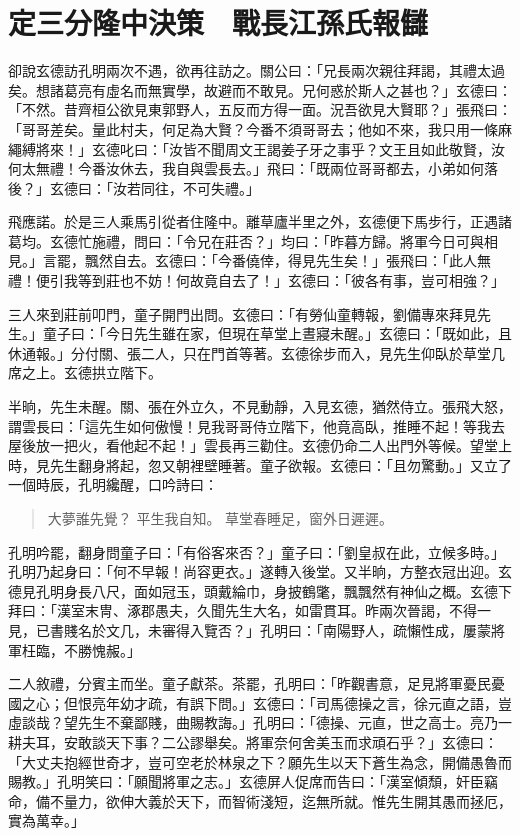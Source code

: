 
\chapter{定三分隆中決策　戰長江孫氏報讎}

卻說玄德訪孔明兩次不遇，欲再往訪之。關公曰：「兄長兩次親往拜謁，其禮太過矣。想諸葛亮有虛名而無實學，故避而不敢見。兄何惑於斯人之甚也？」玄德曰：「不然。昔齊桓公欲見東郭野人，五反而方得一面。況吾欲見大賢耶？」張飛曰：「哥哥差矣。量此村夫，何足為大賢？今番不須哥哥去；他如不來，我只用一條麻繩縛將來！」玄德叱曰：「汝皆不聞周文王謁姜子牙之事乎？文王且如此敬賢，汝何太無禮！今番汝休去，我自與雲長去。」飛曰：「既兩位哥哥都去，小弟如何落後？」玄德曰：「汝若同往，不可失禮。」

飛應諾。於是三人乘馬引從者住隆中。離草廬半里之外，玄德便下馬步行，正遇諸葛均。玄德忙施禮，問曰：「令兄在莊否？」均曰：「昨暮方歸。將軍今日可與相見。」言罷，飄然自去。玄德曰：「今番僥倖，得見先生矣！」張飛曰：「此人無禮！便引我等到莊也不妨！何故竟自去了！」玄德曰：「彼各有事，豈可相強？」

三人來到莊前叩門，童子開門出問。玄德曰：「有勞仙童轉報，劉備專來拜見先生。」童子曰：「今日先生雖在家，但現在草堂上晝寢未醒。」玄德曰：「既如此，且休通報。」分付關、張二人，只在門首等著。玄德徐步而入，見先生仰臥於草堂几席之上。玄德拱立階下。

半晌，先生未醒。關、張在外立久，不見動靜，入見玄德，猶然侍立。張飛大怒，謂雲長曰：「這先生如何傲慢！見我哥哥侍立階下，他竟高臥，推睡不起！等我去屋後放一把火，看他起不起！」雲長再三勸住。玄德仍命二人出門外等候。望堂上時，見先生翻身將起，忽又朝裡壁睡著。童子欲報。玄德曰：「且勿驚動。」又立了一個時辰，孔明纔醒，口吟詩曰：

\begin{quote}
大夢誰先覺？
平生我自知。
草堂春睡足，窗外日遲遲。
\end{quote}

孔明吟罷，翻身問童子曰：「有俗客來否？」童子曰：「劉皇叔在此，立候多時。」孔明乃起身曰：「何不早報！尚容更衣。」遂轉入後堂。又半晌，方整衣冠出迎。玄德見孔明身長八尺，面如冠玉，頭戴綸巾，身披鶴氅，飄飄然有神仙之概。玄德下拜曰：「漢室末冑、涿郡愚夫，久聞先生大名，如雷貫耳。昨兩次晉謁，不得一見，已書賤名於文几，未審得入覽否？」孔明曰：「南陽野人，疏懶性成，屢蒙將軍枉臨，不勝愧赧。」

二人敘禮，分賓主而坐。童子獻茶。茶罷，孔明曰：「昨觀書意，足見將軍憂民憂國之心；但恨亮年幼才疏，有誤下問。」玄德曰：「司馬德操之言，徐元直之語，豈虛談哉？望先生不棄鄙賤，曲賜教誨。」孔明曰：「德操、元直，世之高士。亮乃一耕夫耳，安敢談天下事？二公謬舉矣。將軍奈何舍美玉而求頑石乎？」玄德曰：「大丈夫抱經世奇才，豈可空老於林泉之下？願先生以天下蒼生為念，開備愚魯而賜教。」孔明笑曰：「願聞將軍之志。」玄德屏人促席而告曰：「漢室傾頹，奸臣竊命，備不量力，欲伸大義於天下，而智術淺短，迄無所就。惟先生開其愚而拯厄，實為萬幸。」

